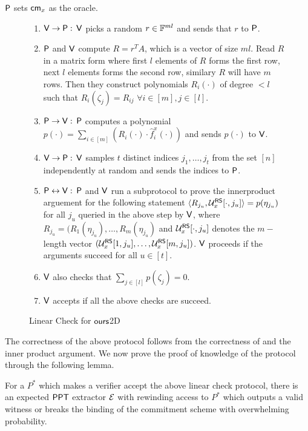 $\mathsf{P}$ sets $\mathsf{cm}_x$ as the oracle.
\begin{figure}[h!]
	\begin{framed}
\begin{enumerate}
	\item $\mathsf{V} \rightarrow \mathsf{P}: $ $\mathsf{V}$ picks a random $r\in \mathbb{F}^{ml}$ and sends that $r$ to $\mathsf{P}$.
	
	\item $\mathsf{P}$ and $\mathsf{V}$ compute $R=r^TA$, which is a vector of size $ml$. Read $R$ in a matrix form where first $l$ elements of $R$ forms the first row, next $l$ elements forms the second row, similary $R$ will have $m$ rows. Then they construct polynomials $R_i(\cdot)$ of degree $<l$ such that $R_i(\zeta_j)=R_{ij}$ $\forall i\in [m], j\in [l]$. 
	
	\item $\mathsf{P} \rightarrow \mathsf{V}: $  $\mathsf{P}$ computes a polynomial $p(\cdot)=\sum_{i\in[m]} ( R_i(\cdot)\cdot \hat{f}^x_i(\cdot))$ and sends $p(\cdot)$ to $\mathsf{V}$.
	
	\item $\mathsf{V} \rightarrow \mathsf{P}: $ $\mathsf{V}$ samples $t$ distinct  indices $j_1,\ldots,j_t$ from the set $[n]$ independently at random and sends the indices to $\mathsf{P}$.
	
	\item $\mathsf{P} \leftrightarrow \mathsf{V}: $ $\mathsf{P}$ and $\mathsf{V}$ run a subprotocol to prove the innerproduct arguement for the following statement $\langle R_{j_u},\mathcal{U}^{\mathsf{RS}}_x[\cdot,j_u]\rangle = p(\eta_{j_u})$ for all $j_u$ queried in the above step by $\mathsf{V}$, where $R_{j_u}=(R_1(\eta_{j_u}),\ldots,R_m(\eta_{j_u})$ and $\mathcal{U}^{\mathsf{RS}}_x[\cdot,j_u]$ denotes the $m-$length vector $(\mathcal{U}^{\mathsf{RS}}_x[1,j_u],\ldots, \mathcal{U}^{\mathsf{RS}}_x[m,j_u])$. $\mathsf{V}$ proceeds if the arguments succeed for all $u \in [t]$.
	
	\item $\mathsf{V}$ also checks that $\sum_{j\in[l]} p(\zeta_j)=0$.
	
	\item $\mathsf{V}$ accepts if all the above checks are succeed.	  
\end{enumerate}
\end{framed}
\caption{Linear Check for $\textsf{ours}$2D}
\end{figure}
The correctness of the above protocol follows from the correctness of \cite{Ligero} and the inner product argument. We now prove the proof of knowledge of the protocol through the following lemma.
\begin{lemma}
For a $P^*$ which makes a verifier accept the above linear check protocol, there is an expected $\mathsf{PPT}$ extractor $\mathcal{E}$ with rewinding access to $P^*$ which outputs a valid witness or breaks the binding of the commitment scheme with overwhelming probability.
\end{lemma}
